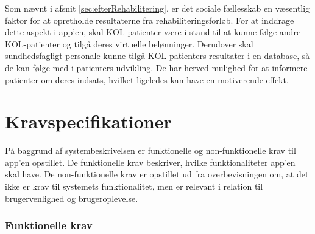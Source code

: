 Som nævnt i afsnit \ref{sec:efterRehabilitering}, er det sociale fællesskab en væsentlig faktor for at opretholde resultaterne fra rehabiliteringsforløb. For at inddrage dette aspekt i app'en, skal KOL-patienter være i stand til at kunne følge andre KOL-patienter og tilgå deres virtuelle belønninger. Derudover skal sundhedsfagligt personale kunne tilgå KOL-patienters resultater i en database, så de kan følge med i patienters udvikling. De har herved mulighed for at informere patienter om deres indsats, hvilket ligeledes kan have en motiverende effekt.\citep{Gade2007, Tricomi2016}


\section{Kravspecifikationer} \label{sec:funktionellekrav}
På baggrund af systembeskrivelsen er funktionelle og non-funktionelle krav til app'en opstillet. De funktionelle krav beskriver, hvilke funktionaliteter app'en skal have. De non-funktionelle krav er opstillet ud fra overbevisningen om, at det ikke er krav til systemets funktionalitet, men er relevant i relation til brugervenlighed og brugeroplevelse. 


\subsubsection{Funktionelle krav}

